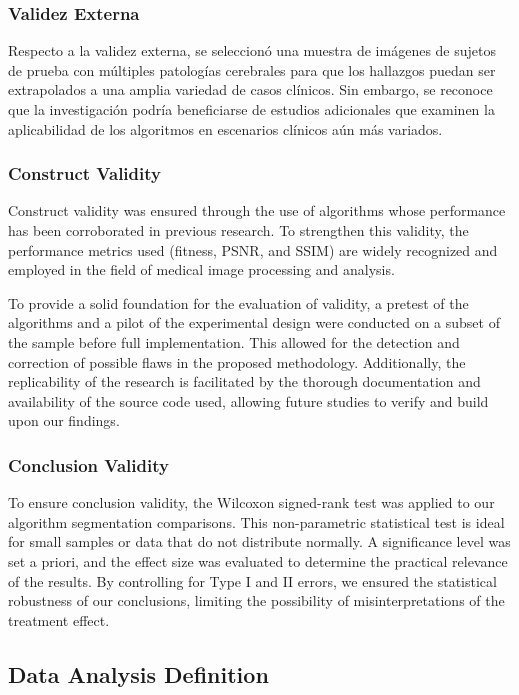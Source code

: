 \documentclass{elsarticle}
\begin{document}
\subsubsection{Validez Externa}
\noindent Respecto a la validez externa, se seleccionó una muestra de imágenes de sujetos de prueba con múltiples patologías cerebrales para que los hallazgos puedan ser extrapolados a una amplia variedad de casos clínicos. Sin embargo, se reconoce que la investigación podría beneficiarse de estudios adicionales que examinen la aplicabilidad de los algoritmos en escenarios clínicos aún más variados.

\subsubsection{Construct Validity}
\noindent Construct validity was ensured through the use of algorithms whose performance has been corroborated in previous research. To strengthen this validity, the performance metrics used (fitness, PSNR, and SSIM) are widely recognized and employed in the field of medical image processing and analysis.

\noindent To provide a solid foundation for the evaluation of validity, a pretest of the algorithms and a pilot of the experimental design were conducted on a subset of the sample before full implementation. This allowed for the detection and correction of possible flaws in the proposed methodology. Additionally, the replicability of the research is facilitated by the thorough documentation and availability of the source code used, allowing future studies to verify and build upon our findings.
\subsubsection{Conclusion Validity}

\noindent To ensure conclusion validity, the Wilcoxon signed-rank test was applied to our algorithm segmentation comparisons. This non-parametric statistical test is ideal for small samples or data that do not distribute normally. A significance level was set a priori, and the effect size was evaluated to determine the practical relevance of the results. By controlling for Type I and II errors, we ensured the statistical robustness of our conclusions, limiting the possibility of misinterpretations of the treatment effect.

\subsection{Data Analysis Definition}
\end{document}
